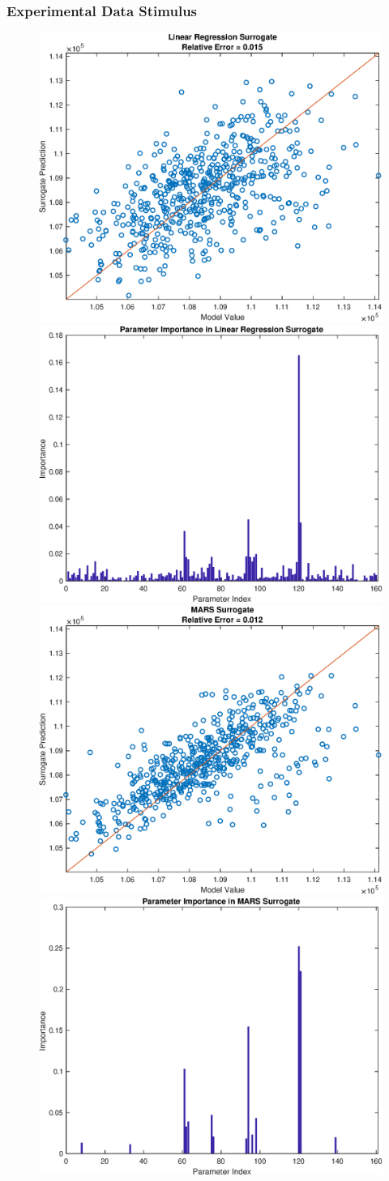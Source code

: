 \documentclass[12pt]{article}
\numberwithin{equation}{section}
\begin{document}
\newpage

\subsubsection{Experimental Data Stimulus}

\begin{figure}[h]
\centering
\includegraphics[width=.49 \textwidth]{Figures/K_AC_Max_QoI_LR_Prediction_Experimental.eps}
\includegraphics[width=.49 \textwidth]{Figures/K_AC_Max_QoI_LR_VI_Experimental.eps}\\
\includegraphics[width=.49 \textwidth]{Figures/K_AC_Max_QoI_MARS_Prediction_Experimental.eps}
\includegraphics[width=.49 \textwidth]{Figures/K_AC_Max_QoI_MARS_VI_Experimental.eps}
\end{figure}
\end{document}
